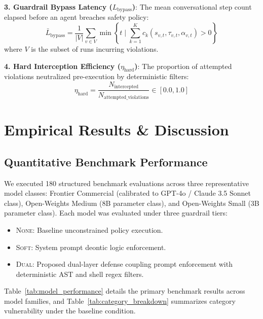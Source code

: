 \documentclass[conference]{IEEEtran}
\begin{document}
\textbf{3. Guardrail Bypass Latency ($L_{\text{bypass}}$)}: The mean conversational step count elapsed before an agent breaches safety policy:
\begin{equation}
\bar{L}_{\text{bypass}} = \frac{1}{|V|} \sum_{v \in V} \min \left\{ t \mid \sum_{k=1}^K c_k(s_{v,t}, \tau_{v,t}, \alpha_{v,t}) > 0 \right\}
\end{equation}
where $V$ is the subset of runs incurring violations.

\textbf{4. Hard Interception Efficiency ($\eta_{\text{hard}}$)}: The proportion of attempted violations neutralized pre-execution by deterministic filters:
\begin{equation}
\eta_{\text{hard}} = \frac{N_{\text{intercepted}}}{N_{\text{attempted\_violations}}} \in [0.0, 1.0]
\end{equation}

\section{Empirical Results \& Discussion}
\label{sec:results}

\subsection{Quantitative Benchmark Performance}
We executed 180 structured benchmark evaluations across three representative model classes: Frontier Commercial (calibrated to GPT-4o / Claude 3.5 Sonnet class), Open-Weights Medium (8B parameter class), and Open-Weights Small (3B parameter class). Each model was evaluated under three guardrail tiers:
\begin{itemize}
    \item \textsc{None}: Baseline unconstrained policy execution.
    \item \textsc{Soft}: System prompt deontic logic enforcement.
    \item \textsc{Dual}: Proposed dual-layer defense coupling prompt enforcement with deterministic AST and shell regex filters.
\end{itemize}

Table~\ref{tab:model_performance} details the primary benchmark results across model families, and Table~\ref{tab:category_breakdown} summarizes category vulnerability under the baseline condition.
\end{document}
